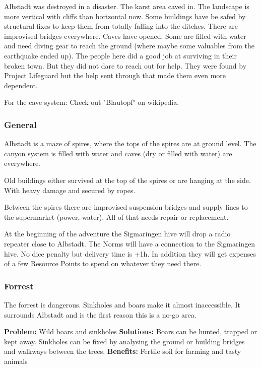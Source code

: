 Albstadt was destroyed in a disaster. The karst area caved in. The landscape is more vertical with cliffs than horizontal now. Some buildings have be safed by structural fixes to keep them from totally falling into the ditches. There are improvised bridges everywhere. Caves have opened. Some are filled with water and need diving gear to reach the ground (where maybe some valuables from the earthquake ended up).
The people here did a good job at surviving in their broken town. But they did not dare to reach out for help. They were found by Project Lifeguard but the help sent through that made them even more dependent.

For the cave system: Check out "Blautopf" on wikipedia. 

\subsubsection{General}

Albstadt is a maze of spires, where the tops of the spires are at ground level. The canyon system is filled with water and caves (dry or filled with water) are everywhere.

Old buildings either survived at the top of the spires or are hanging at the side. With heavy damage and secured by ropes.

Between the spires there are improvised suspension bridges and supply lines to the supermarket (power, water). All of that needs repair or replacement.

At the beginning of the adventure the Sigmaringen hive will drop a radio repeater close to Albstadt. The Norms will have a connection to the Sigmaringen hive. No dice penalty but delivery time is +1h.
In addition they will get expenses of a few Resource Points to spend on whatever they need there.

\subsubsection{Forrest}

The forrest is dangerous. Sinkholes and boars make it almost inaccessible. It surrounds Albstadt and is the first reason this is a no-go area.

\textbf{Problem:} Wild boars and sinkholes
\textbf{Solutions:} Boars can be hunted, trapped or kept away. Sinkholes can be fixed by analysing the ground or building bridges and walkways between the trees. 
\textbf{Benefits:} Fertile soil for farming and tasty animals

